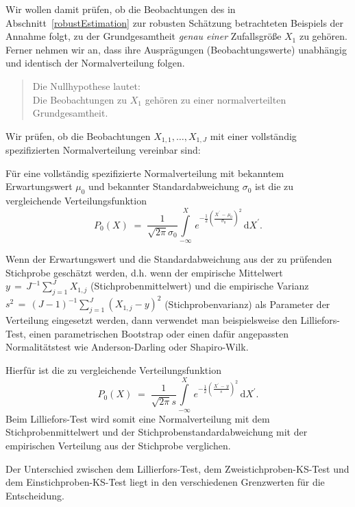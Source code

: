 Wir wollen damit prüfen, ob die Beobachtungen des in Abschnitt~\ref{robustEstimation} zur robusten
Schätzung betrachteten Beispiels der Annahme folgt, zu der Grundgesamtheit \textsl{genau einer}
Zufallsgröße $X_1$ zu gehören. Ferner nehmen wir an, dass ihre Ausprägungen (Beobachtungswerte)
unabhängig und identisch der Normalverteilung folgen.
\begin{quote}
Die Nullhypothese lautet:\\
Die Beobachtungen zu $X_1$ gehören zu einer
normalverteilten Grundgesamtheit.
\end{quote}

Wir prüfen, ob die Beobachtungen $X_{1,1},\ldots,X_{1,J}$ mit einer
vollständig spezifizierten Normalverteilung vereinbar sind:

Für eine vollständig spezifizierte Normalverteilung mit bekanntem Erwartungswert $\mu_0$ und
bekannter Standardabweichung $\sigma_0$ ist die zu vergleichende Verteilungsfunktion
\begin{equation}
P_0(X) \; = \;  \frac{1}{\sqrt{2\pi} \sigma_0}
\int\limits_{-\infty}^X \, e^{-\frac{1}{2}\left(\frac{X^\prime \, - \, \mu_0}{\sigma_0}\right)^2} \, \mathrm{d} X^\prime.
\label{cdfKS}
\end{equation}

Wenn der Erwartungswert und die Standardabweichung aus der zu prüfenden Stichprobe geschätzt werden, d.h. wenn der empirische Mittelwert
$y \,=\,J^{-1}\sum_{j=1}^J X_{1,j}$ (Stichprobenmittelwert) und die empirische Varianz
$s^2 \,=\,(J-1)^{-1}\sum_{j=1}^J(X_{1,j}-y)^2$ (Stichprobenvarianz) als Parameter der Verteilung eingesetzt werden, dann verwendet man beispielsweise den Lilliefors-Test, einen parametrischen Bootstrap oder einen dafür angepassten Normalitätstest wie Anderson-Darling oder Shapiro-Wilk.

Hierfür ist die zu vergleichende Verteilungsfunktion
\begin{equation}
P_0(X) \; = \;  \frac{1}{\sqrt{2\pi} s}
\int\limits_{-\infty}^X \, e^{-\frac{1}{2}\left(\frac{X^\prime \, - \, y}{s}\right)^2} \, \mathrm{d} X^\prime.
\label{cdfKSempirisch}
\end{equation}
Beim Lilliefors-Test wird somit eine Normalverteilung mit dem Stichprobenmittelwert und der Stichprobenstandardabweichung mit der empirischen Verteilung aus der Stichprobe verglichen.

Der Unterschied zwischen dem Lillierfors-Test, dem Zweistichproben-KS-Test und dem Einstichproben-KS-Test liegt in den verschiedenen Grenzwerten für die Entscheidung.

